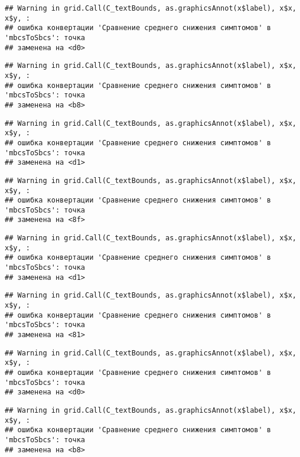\documentclass[
]{article}
\begin{document}
\begin{verbatim}
## Warning in grid.Call(C_textBounds, as.graphicsAnnot(x$label), x$x, x$y, :
## ошибка конвертации 'Сравнение среднего снижения симптомов' в 'mbcsToSbcs': точка
## заменена на <d0>
\end{verbatim}

\begin{verbatim}
## Warning in grid.Call(C_textBounds, as.graphicsAnnot(x$label), x$x, x$y, :
## ошибка конвертации 'Сравнение среднего снижения симптомов' в 'mbcsToSbcs': точка
## заменена на <b8>
\end{verbatim}

\begin{verbatim}
## Warning in grid.Call(C_textBounds, as.graphicsAnnot(x$label), x$x, x$y, :
## ошибка конвертации 'Сравнение среднего снижения симптомов' в 'mbcsToSbcs': точка
## заменена на <d1>
\end{verbatim}

\begin{verbatim}
## Warning in grid.Call(C_textBounds, as.graphicsAnnot(x$label), x$x, x$y, :
## ошибка конвертации 'Сравнение среднего снижения симптомов' в 'mbcsToSbcs': точка
## заменена на <8f>
\end{verbatim}

\begin{verbatim}
## Warning in grid.Call(C_textBounds, as.graphicsAnnot(x$label), x$x, x$y, :
## ошибка конвертации 'Сравнение среднего снижения симптомов' в 'mbcsToSbcs': точка
## заменена на <d1>
\end{verbatim}

\begin{verbatim}
## Warning in grid.Call(C_textBounds, as.graphicsAnnot(x$label), x$x, x$y, :
## ошибка конвертации 'Сравнение среднего снижения симптомов' в 'mbcsToSbcs': точка
## заменена на <81>
\end{verbatim}

\begin{verbatim}
## Warning in grid.Call(C_textBounds, as.graphicsAnnot(x$label), x$x, x$y, :
## ошибка конвертации 'Сравнение среднего снижения симптомов' в 'mbcsToSbcs': точка
## заменена на <d0>
\end{verbatim}

\begin{verbatim}
## Warning in grid.Call(C_textBounds, as.graphicsAnnot(x$label), x$x, x$y, :
## ошибка конвертации 'Сравнение среднего снижения симптомов' в 'mbcsToSbcs': точка
## заменена на <b8>
\end{verbatim}
\end{document}
